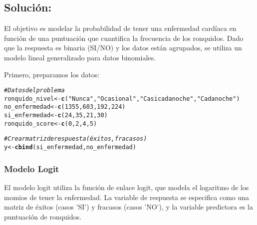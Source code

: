 \documentclass[paper=letter, fontsize=11pt, draft=false]{scrartcl}\usepackage[]{graphicx}\usepackage[]{xcolor}
\makeatletter
\newcommand{\hlnum}[1]{\textcolor[rgb]{0.686,0.059,0.569}{#1}}%
\newcommand{\hlsng}[1]{\textcolor[rgb]{0.192,0.494,0.8}{#1}}%
\newcommand{\hlcom}[1]{\textcolor[rgb]{0.678,0.584,0.686}{\textit{#1}}}%
\newcommand{\hldef}[1]{\textcolor[rgb]{0.345,0.345,0.345}{#1}}%
\newcommand{\hlkwb}[1]{\textcolor[rgb]{0.69,0.353,0.396}{#1}}%
\newcommand{\hlkwd}[1]{\textcolor[rgb]{0.737,0.353,0.396}{\textbf{#1}}}%
\newenvironment{kframe}{%
 \def\at@end@of@kframe{}%
 \ifinner\ifhmode%
  \def\at@end@of@kframe{\end{minipage}}%
  \begin{minipage}{\columnwidth}%
 \fi\fi%
 \def\FrameCommand##1{\hskip\@totalleftmargin \hskip-\fboxsep
 \colorbox{shadecolor}{##1}\hskip-\fboxsep
     \hskip-\linewidth \hskip-\@totalleftmargin \hskip\columnwidth}%
 \MakeFramed {\advance\hsize-\width
   \@totalleftmargin\z@ \linewidth\hsize
   \@setminipage}}%
 {\par\unskip\endMakeFramed%
 \at@end@of@kframe}
\newenvironment{knitrout}{}{} %
\numberwithin{equation}{problemcounter} %
\numberwithin{figure}{problemcounter} %
\numberwithin{table}{problemcounter} %
\numberwithin{subsection}{problemcounter}
\makeatother
\begin{document}
\subsection{\textbf{Solución:}}

El objetivo es modelar la probabilidad de tener una enfermedad cardíaca en función de una puntuación que cuantifica la frecuencia de los ronquidos. Dado que la respuesta es binaria (SI/NO) y los datos están agrupados, se utiliza un modelo lineal generalizado para datos binomiales.

Primero, preparamos los datos:

\begin{knitrout}
\color{fgcolor}\begin{kframe}
\begin{alltt}
\hlcom{# Datos del problema}
\hldef{ronquido_nivel} \hlkwb{<-} \hlkwd{c}\hldef{(}\hlsng{"Nunca"}\hldef{,} \hlsng{"Ocasional"}\hldef{,} \hlsng{"Casi cada noche"}\hldef{,} \hlsng{"Cada noche"}\hldef{)}
\hldef{no_enfermedad} \hlkwb{<-} \hlkwd{c}\hldef{(}\hlnum{1355}\hldef{,} \hlnum{603}\hldef{,} \hlnum{192}\hldef{,} \hlnum{224}\hldef{)}
\hldef{si_enfermedad} \hlkwb{<-} \hlkwd{c}\hldef{(}\hlnum{24}\hldef{,} \hlnum{35}\hldef{,} \hlnum{21}\hldef{,} \hlnum{30}\hldef{)}
\hldef{ronquido_score} \hlkwb{<-} \hlkwd{c}\hldef{(}\hlnum{0}\hldef{,} \hlnum{2}\hldef{,} \hlnum{4}\hldef{,} \hlnum{5}\hldef{)}

\hlcom{# Crear matriz de respuesta (éxitos, fracasos)}
\hldef{y} \hlkwb{<-} \hlkwd{cbind}\hldef{(si_enfermedad, no_enfermedad)}
\end{alltt}
\end{kframe}
\end{knitrout}

\subsubsection*{Modelo Logit}

El modelo logit utiliza la función de enlace logit, que modela el logaritmo de los momios de tener la enfermedad. La variable de respuesta se especifica como una matriz de éxitos (casos 'SI') y fracasos (casos 'NO'), y la variable predictora es la puntuación de ronquidos.
\end{document}
